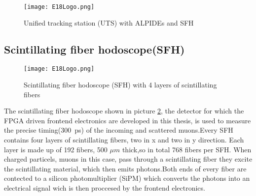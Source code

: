 \begin{figure}[H]	
	\centering
	\texttt{[image: E18Logo.png]}
	\caption{Unified tracking station (UTS) with ALPIDEs and SFH}
	\label{UTSpicture}
\end{figure}
\subsection{Scintillating fiber hodoscope(SFH)}
\begin{figure}[ht]
	\centering
	\texttt{[image: E18Logo.png]}
	\caption{Scintillating fiber hodoscope (SFH) with 4 layers of scintillating fibers}
	\label{SFHpicture}
\end{figure}
The scintillating fiber hodoscope shown in picture \ref{SFHpicture}, the detector for which the FPGA driven frontend electronics are developed in this thesis,
is used to measure the precise timing(\SI{300}{\pico\second}\Autocite{Amber2022Status}) of the incoming and scattered muons.Every SFH contains four layers of scintillating fibers, two in x and two in y direction.
Each layer is made up of 192\autocite{Amber2022Status} fibers, 500 $\mu m$ thick\autocite{Amber2024Status},so in total 768 fibers per SFH. 
When charged particels, muons in this case, pass through a scintillating fiber they excite the scintillating material, 
which then emits photons.Both ends of every fiber are contected to a silicon photomultiplier (SiPM) which converts the photons into an electrical signal wich is then proccesed by the frontend electronics.

